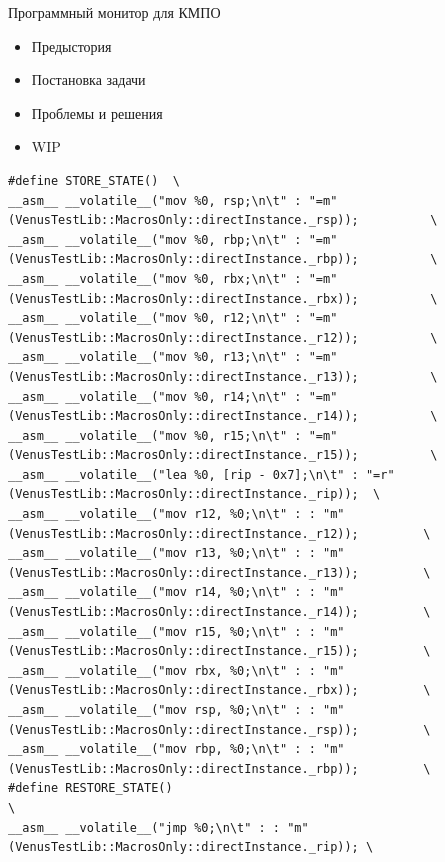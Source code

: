 \begin{frame}[fragile]{Программный монитор для КМПО}
			\begin{itemize}
				\item Предыстория
				\item Постановка задачи
				\item Проблемы и решения
				\item WIP
			\end{itemize}
		\tiny
	\begin{lstlisting}
#define STORE_STATE()  \
__asm__ __volatile__("mov %0, rsp;\n\t" : "=m"(VenusTestLib::MacrosOnly::directInstance._rsp));          \
__asm__ __volatile__("mov %0, rbp;\n\t" : "=m"(VenusTestLib::MacrosOnly::directInstance._rbp));          \
__asm__ __volatile__("mov %0, rbx;\n\t" : "=m"(VenusTestLib::MacrosOnly::directInstance._rbx));          \
__asm__ __volatile__("mov %0, r12;\n\t" : "=m"(VenusTestLib::MacrosOnly::directInstance._r12));          \
__asm__ __volatile__("mov %0, r13;\n\t" : "=m"(VenusTestLib::MacrosOnly::directInstance._r13));          \
__asm__ __volatile__("mov %0, r14;\n\t" : "=m"(VenusTestLib::MacrosOnly::directInstance._r14));          \
__asm__ __volatile__("mov %0, r15;\n\t" : "=m"(VenusTestLib::MacrosOnly::directInstance._r15));          \
__asm__ __volatile__("lea %0, [rip - 0x7];\n\t" : "=r"(VenusTestLib::MacrosOnly::directInstance._rip));  \
__asm__ __volatile__("mov r12, %0;\n\t" : : "m"(VenusTestLib::MacrosOnly::directInstance._r12));         \
__asm__ __volatile__("mov r13, %0;\n\t" : : "m"(VenusTestLib::MacrosOnly::directInstance._r13));         \
__asm__ __volatile__("mov r14, %0;\n\t" : : "m"(VenusTestLib::MacrosOnly::directInstance._r14));         \
__asm__ __volatile__("mov r15, %0;\n\t" : : "m"(VenusTestLib::MacrosOnly::directInstance._r15));         \
__asm__ __volatile__("mov rbx, %0;\n\t" : : "m"(VenusTestLib::MacrosOnly::directInstance._rbx));         \
__asm__ __volatile__("mov rsp, %0;\n\t" : : "m"(VenusTestLib::MacrosOnly::directInstance._rsp));         \
__asm__ __volatile__("mov rbp, %0;\n\t" : : "m"(VenusTestLib::MacrosOnly::directInstance._rbp));         \
#define RESTORE_STATE()                                                                         \
__asm__ __volatile__("jmp %0;\n\t" : : "m"(VenusTestLib::MacrosOnly::directInstance._rip)); \
\end{lstlisting}
\end{frame}

